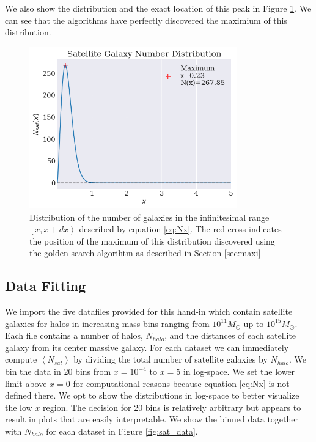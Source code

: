 We also show the distribution and the exact location of this peak in Figure \ref{fig:maximum}. We can see that the algorithms have perfectly discovered the maximium of this distribution.

\begin{figure}
    \centering
    \includegraphics[width=0.8\textwidth]{results/maxi.png}
    \caption{Distribution of the number of galaxies in the infinitesimal range $\left[x, x+dx\right>$ described by equation \ref{eq:Nx}. The red cross indicates the position of the maximum of this distribution discovered using the golden search algorihtm as described in Section \ref{sec:maxi}}
    \label{fig:maximum}
\end{figure}


\subsection{Data Fitting}

We import the five datafiles provided for this hand-in which contain satellite galaxies for halos in increasing mass bins ranging from $10^{11} M_{\odot}$ up to $10^{15} M_{\odot}$. Each file contains a number of halos, $N_{halo}$, and the distances of each satellite galaxy from its center massive galaxy. For each dataset we can immediately compute $\left<N_{sat}\right>$ by dividing the total number of satellite galaxies by $N_{halo}$. We bin the data in 20 bins from $x = 10^{-4}$ to $x=5$ in log-space. We set the lower limit above $x=0$ for computational reasons because equation \ref{eq:Nx} is not defined there. We opt to show the distributions in log-space to better visualize the low $x$ region. The decision for 20 bins is relatively arbitrary but appears to result in plots that are easily interpretable. We show the binned data together with $N_{halo}$ for each dataset in Figure \ref{fig:sat_data}.

